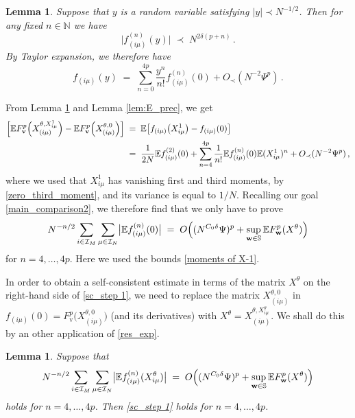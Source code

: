 \documentclass[11pt]{article} %
\numberwithin{equation}{section}
\numberwithin{figure}{section}
\theoremstyle{plain} %
\newtheorem{lemma}[theorem]{Lemma}
\theoremstyle{definition} %
\newcommand{\f}[1]{\boldsymbol{\mathrm{#1}}} %
\newcommand{\bb}{\mathbb} %
\renewcommand{\cal}{\mathcal}
\newcommand{\E}{\mathbb{E}}
\newcommand{\N}{\mathbb{N}}
\newcommand{\pb}[1]{\bigl({#1}\bigr)}
\newcommand{\pB}[1]{\Bigl({#1}\Bigr)}
\newcommand{\qb}[1]{\bigl[{#1}\bigr]}
\newcommand{\qB}[1]{\Bigl[{#1}\Bigr]}
\newcommand{\abs}[1]{\lvert #1 \rvert}
\newcommand{\absb}[1]{\bigl\lvert #1 \bigr\rvert}
\begin{document}
\begin{lemma} \label{lem:taylor_exp}
Suppose that $y$ is a random variable satisfying $\abs{y} \prec N^{-1/2}$. Then for any fixed $n \in \N$ we have
\begin{equation}
\absb{f_{(i \mu)}^{(n)}(y)} \;\prec\; N^{2 \delta (p + n)}\,.
\end{equation}
By Taylor expansion, we therefore have
\begin{equation*}
f_{(i \mu)}(y) \;=\; \sum_{n = 0}^{4p} \frac{y^n}{n!} f_{(i \mu)}^{(n)}(0) + O_\prec(N^{-2} \Psi^p)\,.
\end{equation*}
\end{lemma}

From Lemma \ref{lem:taylor_exp} and Lemma \ref{lem:E_prec}, we get
\begin{align}
\qB{ \E F_{\f v}^p \pB{X^{\theta,X^1_{i \mu}}_{(i \mu)}} - \E F_{\f v}^p \pB{X^{\theta,0}_{(i \mu)}}} &\;=\;
\E \qb{f_{(i \mu)}\pb{X_{i \mu}^1} - f_{(i \mu)}(0)}
\notag \\ \label{moment_matching}
&\;=\; \frac{1}{2 N} \E f^{(2)}_{(i \mu)}(0) + \sum_{n = 4}^{4p} \frac{1}{n!} \E f_{(i \mu)}^{(n)}(0) \E (X_{i \mu}^1)^n + O_\prec(N^{-2} \Psi^p)\,,
\end{align}
where we used that $X_{i \mu}^1$ has vanishing first and third moments, by \eqref{zero_third_moment}, and its variance is equal to $1/N$. Recalling our goal \eqref{main_comparison2}, we therefore find that we only have to prove
\begin{equation} \label{sc_step 1}
N^{-n/2} \sum_{i \in \cal I_M} \sum_{\mu \in \cal I_N} \absb{\E f_{(i \mu)}^{(n)}(0)} \;=\; O \pB{(N^{C_0 \delta}\Psi)^p+ \sup_{\f w \in \bb S}\E F^p_{\f w}(X^\theta)}
\end{equation}
for $n = 4, \dots, 4p$. Here we used the bounds \eqref{moments of X-1}.

In order to obtain a self-consistent estimate in terms of the matrix $X^\theta$ on the right-hand side of \eqref{sc_step 1}, we need to replace the matrix $X^{\theta,0}_{(i \mu)}$ in $f_{(i \mu)}(0) = F_{\f v}^p\pb{X_{(i \mu)}^{\theta, 0}}$ (and its derivatives) with $X^\theta = X^{\theta, X^\theta_{i \mu}}_{(i \mu)}$. We shall do this by an other application of \eqref{res_exp}.

\begin{lemma} \label{lem:0_to_theta}
Suppose that
\begin{equation} \label{sc_step 2}
N^{-n/2} \sum_{i \in \cal I_M} \sum_{\mu \in \cal I_N} \absb{\E f_{(i \mu)}^{(n)}(X_{i \mu}^\theta)} \;=\; O \pB{(N^{C_0 \delta}\Psi)^p + \sup_{\f w \in \bb S}\E F^p_{\f w}(X^\theta)}
\end{equation}
holds for $n = 4, \dots, 4p$. Then \eqref{sc_step 1} holds for $n = 4, \dots, 4 p$.
\end{lemma}
\end{document}
